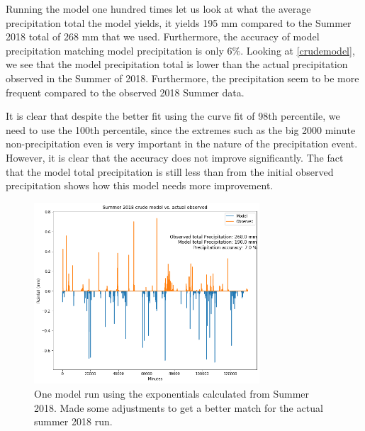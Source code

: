 \documentclass[11pt]{report}
\begin{document}
Running the model one hundred times let us look at what the average
precipitation total the model yields, it yields 195 mm compared to the
Summer 2018 total of 268 mm that we used. Furthermore, the accuracy of model
precipitation matching model precipitation is only 6$\%$. Looking at
\ref{crudemodel}, we see that the model precipitation total is lower than
the actual precipitation observed in the Summer of 2018. Furthermore, the
precipitation seem to be more frequent compared to the observed 2018 Summer
data.

It is clear that despite the better fit using the curve fit of 98th percentile, we need to use the 100th percentile, 
since the extremes such as the big 2000 minute non-precipitation even is very important in the nature of the precipitation event. However, it is clear that the accuracy does not improve significantly. The fact that the model total precipitation is still less than from the initial observed precipitation shows how this model needs more improvement. 
\clearpage
\begin{figure}[t]
  \centering
  \includegraphics[width=0.75\textwidth]{Figures/best_one_run.png}
  \caption[Modified run using Summer 2018 climatology]
  {\label{crudermodel} One model run using the exponentials calculated from
    Summer 2018. Made some adjustments to get a better match for the actual
    summer 2018 run.}
\end{figure}
\end{document}
